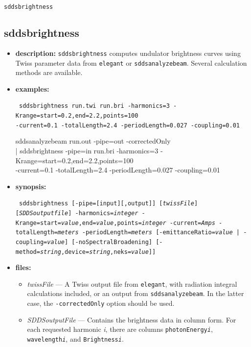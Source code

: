 \documentclass[11pt]{article}
\begin{document}
\newpage
\begin{center}{\Large\verb|sddsbrightness|}\end{center}
\subsection{sddsbrightness}

\begin{itemize}
\item {\bf description:} {\tt sddsbrightness} computes undulator brightness curves using
Twiss parameter data from {\tt elegant} or {\tt sddsanalyzebeam}. Several calculation
methods are available.

\item {\bf examples:}
\begin{flushleft}{\tt
sddsbrightness run.twi run.bri -harmonics=3 -Krange=start=0.2,end=2.2,points=100 \\
  -current=0.1 -totalLength=2.4 -periodLength=0.027 -coupling=0.01

sddsanalyzebeam run.out -pipe=out -correctedOnly \\ 
 | sddsbrightness -pipe=in run.bri -harmonics=3 -Krange=start=0.2,end=2.2,points=100 \\
  -current=0.1 -totalLength=2.4 -periodLength=0.027 -coupling=0.01
}\end{flushleft}

\item {\bf synopsis:}
\begin{flushleft}{\tt
sddsbrightness [-pipe=[input][,output]] [{\em twissFile}] [{\em SDDSoutputfile}]
 -harmonics={\em integer} -Krange=start={\em value},end={\em value},points={\em integer}
 -current={\em Amps} -totalLength={\em meters} -periodLength={\em meters}
 [-emittanceRatio={\em value} | -coupling={\em value}] [-noSpectralBroadening]
 [-method={\em string},device={\em string},neks={\em value}]] 
}\end{flushleft}

\item {\bf files:}
\begin{itemize}
\item {\em twissFile} --- A Twiss output file from {\tt elegant}, with radiation integral 
calculations included, or an output from {\tt sddsanalyzebeam}. In the latter case, the
{\tt -correctedOnly} option should be used.
\item {\em SDDSoutputFile} --- Contains the brightness data in column form.  For each 
requested harmonic {\em i}, there are columns {\tt photonEnergy{\em i}}, {\tt wavelength{\em i}},
and {\tt Brightness{\em i}}.
\end{itemize}


\end{itemize}
\end{document}
